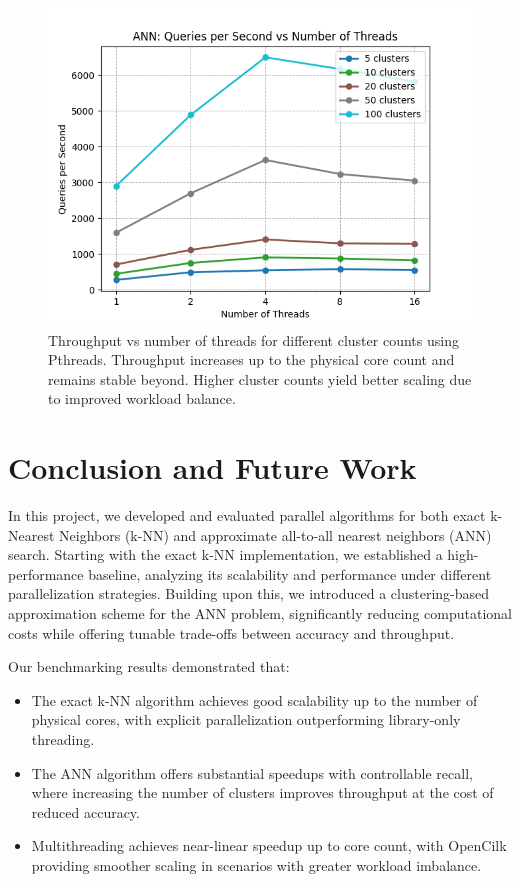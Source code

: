 \documentclass{article}
\begin{document}
\begin{figure}
    \centering
    \includegraphics[width=0.5\linewidth]{figures/ann_throughput_vs_threads.png}
    \caption{Throughput vs number of threads for different cluster counts using Pthreads. Throughput 
    increases up to the physical core count and remains stable beyond. Higher cluster counts yield better 
    scaling due to improved workload balance.}
    \label{fig:ann_throughput_vs_threads}
\end{figure}

\section*{Conclusion and Future Work}

In this project, we developed and evaluated parallel algorithms for both exact k-Nearest Neighbors (k-NN) 
and approximate all-to-all nearest neighbors (ANN) search. Starting with the exact k-NN implementation, 
we established a high-performance baseline, analyzing its scalability and performance under different 
parallelization strategies. Building upon this, we introduced a clustering-based approximation scheme 
for the ANN problem, significantly reducing computational costs while offering tunable trade-offs 
between accuracy and throughput.

Our benchmarking results demonstrated that:
\begin{itemize}
    \item The exact k-NN algorithm achieves good scalability up to the number of physical cores, with 
    explicit parallelization outperforming library-only threading.
    \item The ANN algorithm offers substantial speedups with controllable recall, where increasing the 
    number of clusters improves throughput at the cost of reduced accuracy.
    \item Multithreading achieves near-linear speedup up to core count, with OpenCilk providing smoother 
    scaling in scenarios with greater workload imbalance.
\end{itemize}
\end{document}
